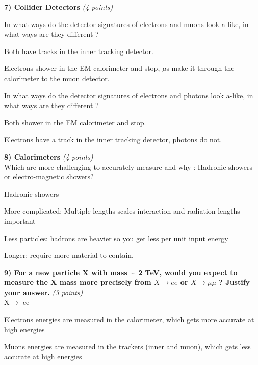 {\vspace*{0.5in}

\textbf{7) Collider Detectors  } \hfill \textit{(4 points)}\\
\begin{itemize}
\item[a)]{ In what ways do the detector signatures of electrons and muons look a-like, in what ways are they different ?

\bi
\item[-]Both have tracks in the inner tracking detector. 
\item[-]Electrons shower in the EM calorimeter and stop, $\mu$s make it through the calorimeter to the muon detector.
\ei

}
\item[b)]{ In what ways do the detector signatures of electrons and photons look a-like, in what ways are they different ?

\bi
\item[-]Both shower in the EM calorimeter and stop.
\item[-]Electrons have a track in the inner tracking detector, photons do not.
\ei


}
\end{itemize}

\vspace*{0.5in}
        

\textbf{8) Calorimeters } \hfill \textit{(4 points)}\\
Which are more challenging to accurately measure and why : Hadronic showers or electro-magnetic showers? 

Hadronic showers
\bi
\item[-] More complicated:  Multiple lengths scales interaction and radiation lengths important
\item[-] Less particles:  hadrons are heavier so you get less per unit input energy
\item[-] Longer: require more material to contain. 
\ei

\vspace*{0.5in}


\textbf{9) For a new particle X with mass $\sim$ 2 TeV,  would you expect to measure the X mass more precisely from $X\rightarrow ee$ or $X \rightarrow \mu\mu$ ? Justify your answer.} \hfill \textit{(3 points)}\\

X$\rightarrow$ ee
\bi
\item[-] Electrons energies are measured in the calorimeter, which gets more accurate at high energies
\item[-] Muons energies are measured in the trackers (inner and muon), which gets less accurate at high energies
\ei

}
